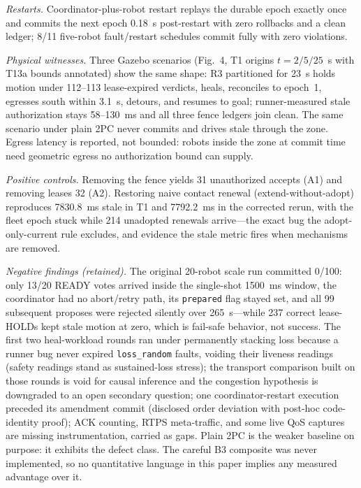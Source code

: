 \documentclass[10pt,journal]{IEEEtran}
\begin{document}
\emph{Restarts.} Coordinator-plus-robot restart replays the durable
epoch exactly once and commits the next epoch 0.18~s post-restart
with zero rollbacks and a clean ledger; 8/11 five-robot fault/restart
schedules commit fully with zero violations.

\emph{Physical witnesses.} Three Gazebo scenarios (Fig.~4, T1 origins
$t{=}2/5/25$~s with T13a bounds annotated) show the
same shape: R3 partitioned for 23~s holds motion under 112--113
lease-expired verdicts, heals, reconciles to epoch~1, egresses south
within 3.1~s, detours, and resumes to goal; runner-measured stale
authorization stays 58--130~ms and all three fence ledgers join clean.
The same scenario under plain 2PC never commits and drives stale
through the zone. Egress latency is reported, not bounded: robots
inside the zone at commit time need geometric egress no authorization
bound can supply.

\emph{Positive controls.} Removing the fence yields 31 unauthorized
accepts (A1) and removing leases 32 (A2). Restoring naive contact
renewal (extend-without-adopt) reproduces 7830.8~ms stale in T1 and
7792.2~ms in the corrected rerun, with the fleet epoch stuck while
214 unadopted renewals arrive---the exact bug the adopt-only-current
rule excludes, and evidence the stale metric fires when mechanisms are
removed.

\emph{Negative findings (retained).} The original 20-robot scale run
committed 0/100: only 13/20 READY votes arrived inside the single-shot
1500~ms window, the coordinator had no abort/retry path, its
\texttt{prepared} flag stayed set, and all 99 subsequent proposes were
rejected silently over 265~s---while 237 correct lease-HOLDs kept
stale motion at zero, which is fail-safe behavior, not success. The
first two heal-workload rounds ran under
permanently stacking loss because a runner bug never expired
\texttt{loss\_random} faults, voiding their liveness readings (safety
readings stand as sustained-loss stress); the transport comparison
built on those rounds is void for causal inference and the
congestion hypothesis is downgraded to an open secondary question;
one coordinator-restart execution preceded its amendment commit
(disclosed order deviation with post-hoc code-identity proof); ACK
counting, RTPS meta-traffic, and some live QoS captures are missing
instrumentation, carried as gaps. Plain 2PC is the weaker baseline
on purpose: it exhibits the defect class. The careful B3 composite
was never implemented, so no quantitative language in this paper
implies any measured advantage over it.
\end{document}
